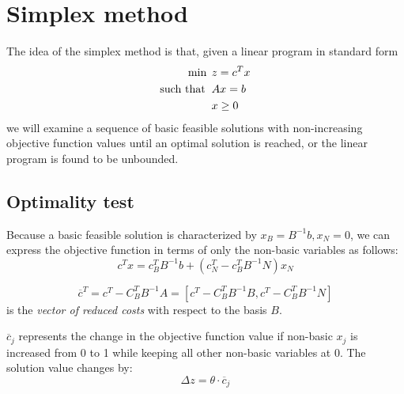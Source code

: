 \documentclass[12pt, a4paper]{report}
\begin{document}
    \section{Simplex method}
    The idea of the simplex method is that, given a linear program in standard form
    \begin{align*}
        \min                      \:&\: z=c^Tx              \\
        \textnormal{such that }     &\: Ax=b                \\
                                    &\: x \geq 0
    \end{align*}
    we will examine a sequence of basic feasible solutions with non-increasing objective function values until an optimal solution is reached, or the  linear program is 
    found to be unbounded. 
    
    \subsection{Optimality test}
    Because a basic feasible solution is characterized by $x_B=B^{-1}b,x_N=0$, we can express the objective function in terms of only the non-basic variables as follows:
    \[c^Tx=c_B^TB^{-1}b+\left(c_N^T-c_B^TB^{-1}N\right)x_N\]
    \newpage
    \begin{definition}
        \[\overline{c}^T=c^T-C_B^TB^{-1}A=\left[c^T-C_B^TB^{-1}B,c^T-C_B^TB^{-1}N\right]\]
        is the \emph{vector of reduced costs} with respect to the basis $B$. 
    \end{definition}
    $\overline{c}_j$ represents the change in the objective function value if non-basic $x_j$ is increased from 0 to 1 while keeping all other non-basic variables at 0. 
    The solution value changes by:
    \[\Delta z=\theta \cdot \overline{c}_j\]
\end{document}
